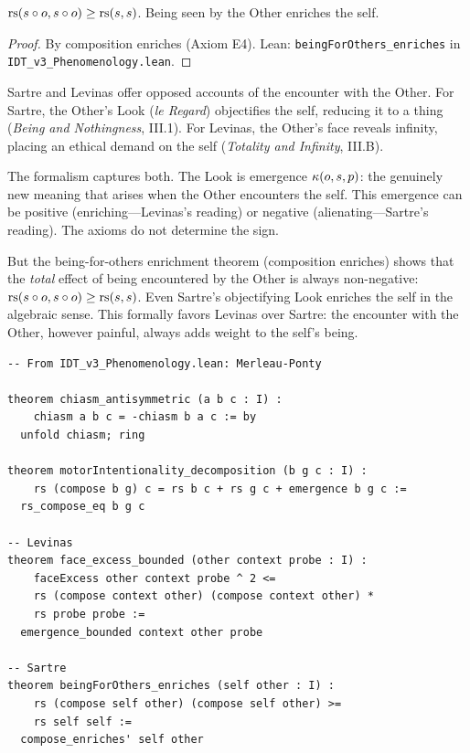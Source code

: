 \begin{theorem}
\label{thm:for-others-enriches}
$\mathrm{rs}(s \circ o, s \circ o) \geq \mathrm{rs}(s, s)$.
Being seen by the Other enriches the self.
\end{theorem}

\begin{proof}
By composition enriches (Axiom E4).
Lean: \texttt{beingForOthers\_enriches} in
\texttt{IDT\_v3\_Phenomenology.lean}.
\end{proof}

\begin{interpretation}
Sartre and Levinas offer opposed accounts of the encounter with the Other.
For Sartre, the Other's Look (\textit{le Regard}) objectifies the self,
reducing it to a thing (\textit{Being and Nothingness}, III.1). For Levinas,
the Other's face reveals infinity, placing an ethical demand on the self
(\textit{Totality and Infinity}, III.B).

The formalism captures both. The Look is emergence $\kappa(o, s, p)$:
the genuinely new meaning that arises when the Other encounters the self.
This emergence can be positive (enriching---Levinas's reading) or negative
(alienating---Sartre's reading). The axioms do not determine the sign.

But the being-for-others enrichment theorem (composition enriches) shows that
the \emph{total} effect of being encountered by the Other is always
non-negative: $\mathrm{rs}(s \circ o, s \circ o) \geq \mathrm{rs}(s, s)$. Even
Sartre's objectifying Look enriches the self in the algebraic sense. This
formally favors Levinas over Sartre: the encounter with the Other, however
painful, always adds weight to the self's being.
\end{interpretation}

\begin{lstlisting}
-- From IDT_v3_Phenomenology.lean: Merleau-Ponty

theorem chiasm_antisymmetric (a b c : I) :
    chiasm a b c = -chiasm b a c := by
  unfold chiasm; ring

theorem motorIntentionality_decomposition (b g c : I) :
    rs (compose b g) c = rs b c + rs g c + emergence b g c :=
  rs_compose_eq b g c

-- Levinas
theorem face_excess_bounded (other context probe : I) :
    faceExcess other context probe ^ 2 <=
    rs (compose context other) (compose context other) *
    rs probe probe :=
  emergence_bounded context other probe

-- Sartre
theorem beingForOthers_enriches (self other : I) :
    rs (compose self other) (compose self other) >=
    rs self self :=
  compose_enriches' self other
\end{lstlisting}

